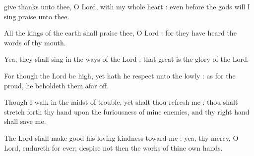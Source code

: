  give thanks unto thee, O Lord, with my whole heart : even before the gods will I sing praise unto thee.\par
{}
All the kings of the earth shall praise thee, O Lord : for they have heard the words of thy mouth.\par
{}Yea, they shall sing in the ways of the Lord : that great is the glory of the Lord.\par
{}For though the Lord be high, yet hath he respect unto the lowly : as for the proud, he beholdeth them afar off.\par
{}Though I walk in the midst of trouble, yet shalt thou refresh me : thou shalt stretch forth thy hand upon the furiousness of mine enemies, and thy right hand shall save me.\par
{}The Lord shall make good his loving-kindness toward me : yea, thy mercy, O Lord, endureth for ever; despise not then the works of thine own hands.\par



